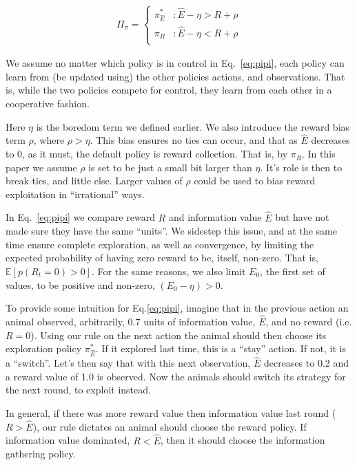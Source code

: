 \begin{equation} 
    \label{eq:pipi}
    \begin{split}
        \Pi_{\pi} = 
        \begin{cases}
            \pi^*_{\hat{E}} & : \hat{E} - \eta > R + \rho \\
            \pi_R 	& : \hat{E} - \eta < R + \rho \\
        \end{cases}
    \end{split}
\end{equation}

We assume no matter which policy is in control in Eq.~\ref{eq:pipi}, each policy can learn from (be updated using) the other policies actions, and observations. That is, while the two policies compete for control, they learn from each other in a cooperative fashion.

Here $\eta$ is the boredom term we defined earlier. We also introduce the reward bias term $\rho$, where $\rho > \eta$. This bias ensures no ties can occur, and that as $\hat E$ decreases to 0, as it must, the default policy is reward collection. That is, by $\pi_R$. In this paper we assume $\rho$ is set to be just a small bit larger than $\eta$. It's role is then to break ties, and little else. Larger values of $\rho$ could be used to bias reward exploitation in ``irrational'' ways.

In Eq.~\ref{eq:pipi} we compare reward $R$ and information value $\hat E$ but have not made sure they have the same ``units''. We sidestep this issue, and at the same time ensure complete exploration, as well as convergence, by limiting the expected probability of having zero reward to be, itself, non-zero. That is, $\mathbb{E}[p(R_t=0) > 0]$. For the same reasons, we also limit $E_0$, the first set of values, to be positive and non-zero, $(E_0 - \eta) > 0$. 

To provide some intuition for Eq.\ref{eq:pipi}, imagine that in the previous action an animal observed, arbitrarily, 0.7 units of information value, $\hat E$, and no reward (i.e. $R = 0$). Using our rule on the next action the animal should then choose its exploration policy $\pi^*_{\hat{E}}$. If it explored last time, this is a ``stay'' action. If not, it is a ``switch''. Let's then say that with this next observation, $\hat E$ decreases to 0.2 and a reward value of 1.0 is observed. Now the animals should switch its strategy for the next round, to exploit instead. 

In general, if there was more reward value then information value last round ($R > \hat E$), our rule dictates an animal should choose the reward policy. If information value dominated, $R < \hat E$, then it should choose the information gathering policy.

